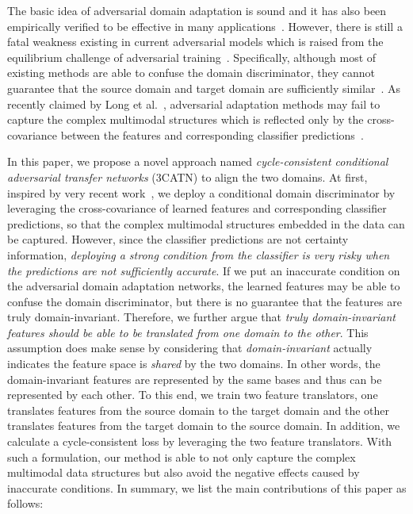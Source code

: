 \documentclass[sigconf]{acmart}
\begin{document}
The basic idea of adversarial domain adaptation is sound and it has also been empirically verified to be effective in many applications~\cite{chen2017no,bousmalis2017unsupervised,hoffman2018cycada}. However, there is still a fatal weakness existing in current adversarial models which is raised from the equilibrium challenge of adversarial training~\cite{arora2017generalization}. Specifically, although most of existing methods are able to confuse the domain discriminator, they cannot guarantee that the source domain and target domain are sufficiently similar~\cite{arora2017generalization}. As recently claimed by Long et al.~\cite{long2018conditional}, adversarial adaptation methods may fail to capture the complex multimodal structures which is reflected only by the cross-covariance between the features and corresponding classifier predictions~\cite{song2009hilbert,long2018conditional}. 

In this paper, we propose a novel approach named {\it cycle-consistent conditional adversarial transfer networks} (3CATN) to align the two domains. At first, inspired by very recent work~\cite{long2018conditional}, we deploy a conditional domain discriminator by leveraging the cross-covariance of learned features and corresponding classifier predictions, so that the complex multimodal structures embedded in the data can be captured. However, since the classifier predictions are not certainty information, {\it deploying a strong condition from the classifier is very risky when the predictions are not sufficiently accurate}. If we put an inaccurate condition on the adversarial domain adaptation networks, the learned features may be able to confuse the domain discriminator, but there is no guarantee that the features are truly domain-invariant. Therefore, we further argue that {\it truly domain-invariant features should be able to be translated from one domain to the other}. This assumption does make sense by considering that {\it domain-invariant} actually indicates the feature space is {\it shared} by the two domains. In other words, the domain-invariant features are represented by the same bases and thus can be represented by each other. To this end, we  train two feature translators, one translates features from the source domain to the target domain and the other translates features from the target domain to the source domain. In addition, we calculate a cycle-consistent loss by leveraging the two feature translators. With such a formulation, our method is able to not only capture the complex multimodal data structures but also avoid the negative effects caused by inaccurate conditions. In summary, we list the main contributions of this paper as follows:
\end{document}
